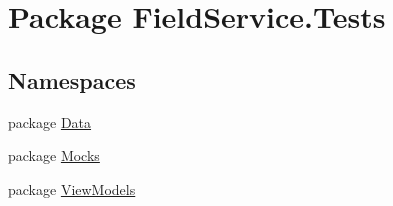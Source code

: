 \hypertarget{namespace_field_service_1_1_tests}{\section{Package Field\+Service.\+Tests}
\label{namespace_field_service_1_1_tests}
}
\subsection*{Namespaces}
\begin{DoxyCompactItemize}
\item 
package \hyperlink{namespace_field_service_1_1_tests_1_1_data}{Data}
\item 
package \hyperlink{namespace_field_service_1_1_tests_1_1_mocks}{Mocks}
\item 
package \hyperlink{namespace_field_service_1_1_tests_1_1_view_models}{View\+Models}
\end{DoxyCompactItemize}

